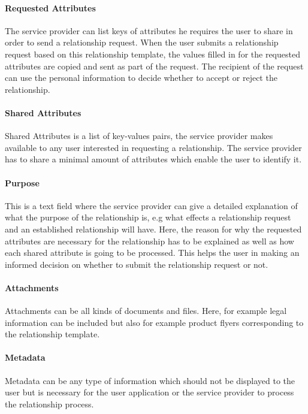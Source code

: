 \paragraph{Requested Attributes} The service provider can list keys of attributes he requires the user to share in order to send a relationship request. When the user submits a relationship request based on this relationship template, the values filled in for the requested attributes are copied and sent as part of the request. The recipient of the request can use the personal information to decide whether to accept or reject the relationship.
    
\paragraph{Shared Attributes} Shared Attributes is a list of key-values pairs, the service provider makes available to any user interested in requesting a relationship. The service provider has to share a minimal amount of attributes which enable the user to identify it. 
    
\paragraph{Purpose} This is a text field where the service provider can give a detailed explanation of what the purpose of the relationship is, e.g what effects a relationship request and an established relationship will have. Here, the reason for why the requested attributes are necessary for the relationship has to be explained as well as how each shared attribute is going to be processed. This helps the user in making an informed decision on whether to submit the relationship request or not.
    
\paragraph{Attachments} Attachments can be all kinds of documents and files. Here, for example legal information can be included but also for example product flyers corresponding to the relationship template.
    
\paragraph{Metadata} Metadata can be any type of information which should not be displayed to the user but is necessary for the user application or the service provider to process the relationship process.

